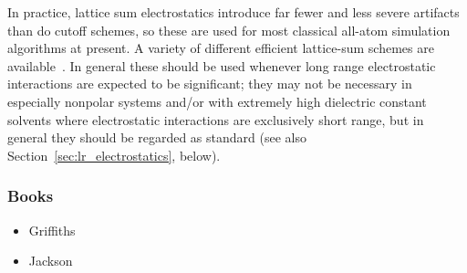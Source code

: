 \documentclass[9pt,bestpractices]{livecoms}
\begin{document}
In practice, lattice sum electrostatics introduce far fewer and less severe artifacts than do cutoff schemes, so these are used for most classical all-atom simulation algorithms at present. 
A variety of different efficient lattice-sum schemes are available~\cite{Cisneros:2014:Chem.Rev.}.
In general these should be used whenever long range electrostatic interactions are expected to be significant; they may not be necessary in especially nonpolar systems and/or with extremely high dielectric constant solvents where electrostatic interactions are exclusively short range, but in general they should be regarded as standard (see also Section~\ref{sec:lr_electrostatics}, below). 



\subsubsection{Books}
\begin{itemize}
\item Griffiths
\item Jackson
\end{itemize}

\end{document}

